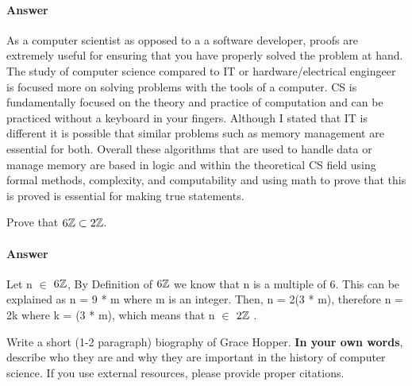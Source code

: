 \documentclass{article}
\begin{document}
\paragraph{Answer}As a computer scientist as opposed to a a software developer, 
proofs are extremely useful for ensuring that you have properly solved the problem at hand. 
The study of computer science compared to IT or hardware/electrical engingeer is focused more on solving problems with the tools of a computer. 
CS is fundamentally focused on the theory and practice of computation and can be practiced without a keyboard in your fingers. 
Although I stated that IT is different it is possible that similar problems such as memory management are essential for both. 
Overall these algorithms that are used to handle data or manage memory are based in logic and within the theoretical CS field using formal methods, 
complexity, and computability and using math to prove that this is proved is essential for making true statements.



Prove that $6{\mathbb Z} \subset 2{\mathbb Z}$.

\paragraph{Answer}Let n $\in$ $6{\mathbb Z}$, By Definition of $6{\mathbb Z}$ we know that n is a multiple of 6. 
This can be explained as n = 9 * m where m is an integer. 
Then, n = 2(3 * m), therefore n = 2k where k = (3 * m), which means that n $\in$ $2{\mathbb Z}$ . 



Write a short (1-2 paragraph) biography of Grace Hopper.
\textbf{In your own words}, describe who they are and why they are important in
the history of computer science.  If you use external resources, please provide
proper citations.
\end{document}

